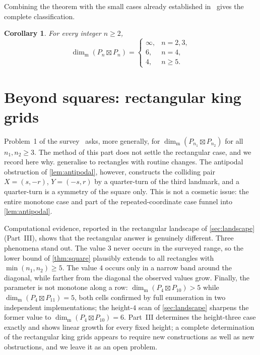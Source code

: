 \documentclass[11pt]{amsart}
\newtheorem{corollary}[corollary]{Corollary}
\theoremstyle{remark}
\newcommand{\mdim}{\operatorname{dim}_{\mathrm m}}
\begin{document}
Combining the theorem with the small cases already established in~\cite{HakanenYero2024} gives the complete classification.

\begin{corollary}\label{cor:classification}
For every integer $n\ge2$,
\[
 \mdim(P_n\boxtimes P_n)=
 \begin{cases}
 \infty, & n=2,3,\\
 6, & n=4,\\
 4, & n\ge5.
 \end{cases}
\]
\end{corollary}

\section{Beyond squares: rectangular king grids}\label{sec:rect}

Problem~1 of the survey~\cite{FarhanEtAl2026} asks, more generally, for $\mdim(P_{n_1}\boxtimes P_{n_2})$ for all $n_1,n_2\ge3$.  The method of this part does not settle the rectangular case, and we record here why.   generalise to rectangles with routine changes.  The antipodal obstruction of \cref{lem:antipodal}, however, constructs the colliding pair $X=(s,-r)$, $Y=(-s,r)$ by a quarter-turn of the third landmark, and a quarter-turn is a symmetry of the square only.  This is not a cosmetic issue: the entire monotone case and part of the repeated-coordinate case funnel into \cref{lem:antipodal}.

Computational evidence, reported in the rectangular landscape of \cref{sec:landscape} (Part~III), shows that the rectangular answer is genuinely different.  Three phenomena stand out.  The value $3$ never occurs in the surveyed range, so the lower bound of \cref{thm:square} plausibly extends to all rectangles with $\min(n_1,n_2)\ge5$.  The value $4$ occurs only in a narrow band around the diagonal, while farther from the diagonal the observed values grow.  Finally, the parameter is not monotone along a row: $\mdim(P_4\boxtimes P_{10})>5$ while $\mdim(P_4\boxtimes P_{11})=5$, both cells confirmed by full enumeration in two independent implementations; the height-$4$ scan of \cref{sec:landscape} sharpens the former value to $\mdim(P_4\boxtimes P_{10})=6$.  Part~III determines the height-three case exactly and shows linear growth for every fixed height; a complete determination of the rectangular king grids appears to require new constructions as well as new obstructions, and we leave it as an open problem.
\end{document}
